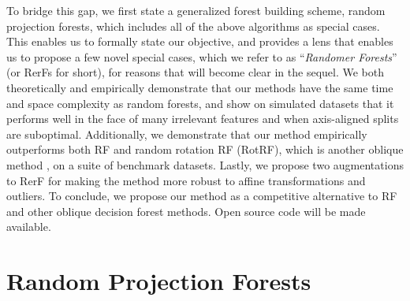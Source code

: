 \documentclass{article}
\begin{document}
To bridge this gap, we first state a generalized forest building scheme, random projection forests, which includes all of the above algorithms as special cases. This enables us to formally state our objective, and provides a lens that enables us to propose a few novel special cases, which we refer to as ``{\em{Randomer Forests}}'' (or RerFs for short), for reasons that will become clear in the sequel. We both theoretically and empirically demonstrate that our methods have the same time and space complexity as random forests, and show on simulated datasets that it performs well in the face of many irrelevant features and when axis-aligned splits are suboptimal. Additionally, we demonstrate that our method empirically outperforms both RF and random rotation RF (RotRF), which is another oblique method \cite{Blaser2015}, on a suite of benchmark datasets. Lastly, we propose two augmentations to RerF for making the method more robust to affine transformations and outliers. To conclude, we propose our method as a competitive alternative to RF and other oblique decision forest methods. Open source code will be made available.

\section{Random Projection Forests}
\end{document}
